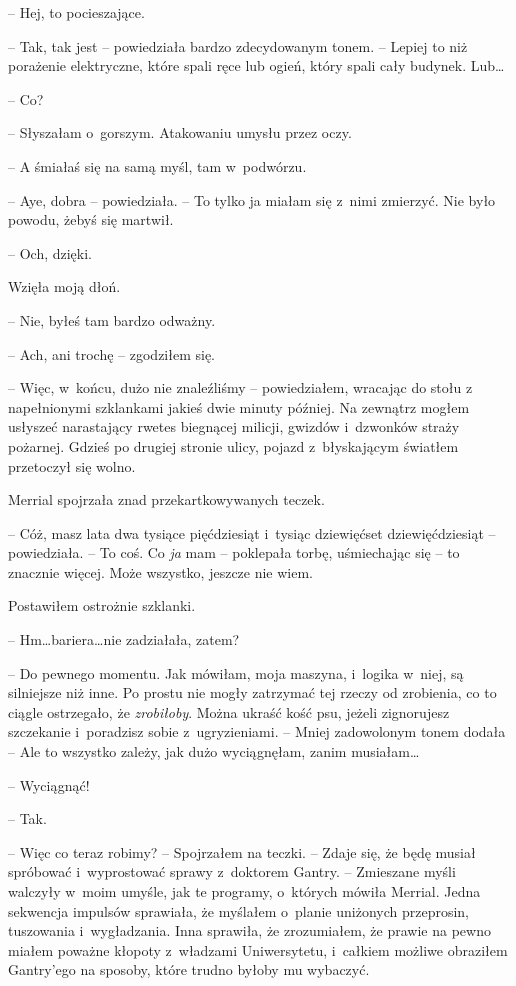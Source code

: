 \documentclass[oneside,polish,11pt,sfheadings]{mwbk}
\begin{document}
-- Hej, to pocieszające.

-- Tak, tak jest -- powiedziała bardzo zdecydowanym tonem. -- Lepiej to niż
porażenie elektryczne, które spali ręce lub ogień, który spali cały
budynek. Lub\ldots

-- Co?

-- Słyszałam o~gorszym. Atakowaniu umysłu przez oczy.

-- A śmiałaś się na samą myśl, tam w~podwórzu.

-- Aye, dobra -- powiedziała. -- To tylko ja miałam się z~nimi zmierzyć.
Nie było powodu, żebyś się martwił.

-- Och, dzięki.

Wzięła moją dłoń. 

-- Nie, byłeś tam bardzo odważny.

-- Ach, ani trochę -- zgodziłem się.

-- Więc, w~końcu, dużo nie znaleźliśmy -- powiedziałem, wracając do stołu
z napełnionymi szklankami jakieś dwie minuty później. Na zewnątrz mogłem
usłyszeć narastający rwetes biegnącej milicji, gwizdów i~dzwonków straży
pożarnej. Gdzieś po drugiej stronie ulicy, pojazd z~błyskającym światłem
przetoczył się wolno.

Merrial spojrzała znad przekartkowywanych teczek.

-- Cóż, masz lata dwa tysiące pięćdziesiąt i~tysiąc dziewięćset
dziewięćdziesiąt -- powiedziała. -- To coś. Co \textit{ja} mam -- poklepała
torbę, uśmiechając się -- to znacznie więcej. Może wszystko, jeszcze nie
wiem.

Postawiłem ostrożnie szklanki.

-- Hm\ldots bariera\ldots nie zadziałała, zatem?

-- Do pewnego momentu. Jak mówiłam, moja maszyna, i~logika w~niej, są
silniejsze niż inne. Po prostu nie mogły zatrzymać tej rzeczy od
zrobienia, co to ciągle ostrzegało, że \textit{zrobiłoby}. Można ukraść
kość psu, jeżeli zignorujesz szczekanie i~poradzisz sobie z~ugryzieniami. -- Mniej zadowolonym tonem dodała -- Ale to wszystko zależy,
jak dużo wyciągnęłam, zanim musiałam\ldots

-- Wyciągnąć!

-- Tak.

-- Więc co teraz robimy? -- Spojrzałem na teczki. -- Zdaje się, że będę
musiał spróbować i~wyprostować sprawy z~doktorem Gantry. -- Zmieszane
myśli walczyły w~moim umyśle, jak te programy, o~których mówiła Merrial.
Jedna sekwencja impulsów sprawiała, że myślałem o~planie uniżonych
przeprosin, tuszowania i~wygładzania. Inna sprawiła, że zrozumiałem, że
prawie na pewno miałem poważne kłopoty z~władzami Uniwersytetu, i~całkiem możliwe obraziłem Gantry'ego na sposoby, które trudno byłoby mu
wybaczyć.
\end{document}
